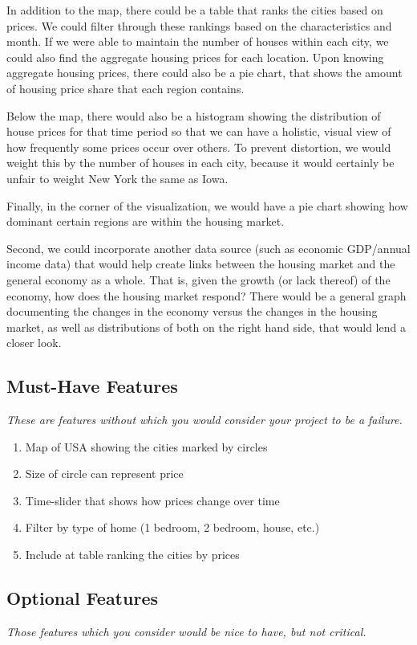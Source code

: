 \documentclass[12pt]{article}
\begin{document}
In addition to the map, there could be a table that ranks the cities based on prices. We could filter through these rankings based on the characteristics and month. If we were able to maintain the number of houses within each city, we could also find the aggregate housing prices for each location. Upon knowing aggregate housing prices, there could also be a pie chart, that shows the amount of housing price share that each region contains.

Below the map, there would also be a histogram showing the distribution of house prices for that time period so that we can have a holistic, visual view of how frequently some prices occur over others. To prevent distortion, we would weight this by the number of houses in each city, because it would certainly be unfair to weight New York the same as Iowa.

Finally, in the corner of the visualization, we would have a pie chart showing how dominant certain regions are within the housing market.

Second, we could incorporate another data source (such as economic GDP/annual income data) that would help create links between the housing market and the general economy as a whole. That is, given the growth (or lack thereof) of the economy, how does the housing market respond? There would be a general graph documenting the changes in the economy versus the changes in the housing market, as well as distributions of both on the right hand side, that would lend a closer look.

\subsection*{Must-Have Features}
\vspace{-3mm}
{\it These are features without which you would consider your project to be a failure.}

\begin{enumerate}
\item Map of USA showing the cities marked by circles
\item Size of circle can represent price
\item Time-slider that shows how prices change over time
\item Filter by type of home (1 bedroom, 2 bedroom, house, etc.)
\item Include at table ranking the cities by prices
\end{enumerate}

\subsection*{Optional Features}
\vspace{-3mm} 
{\it Those features which you consider would be nice to have, but not critical.}
\end{document}
